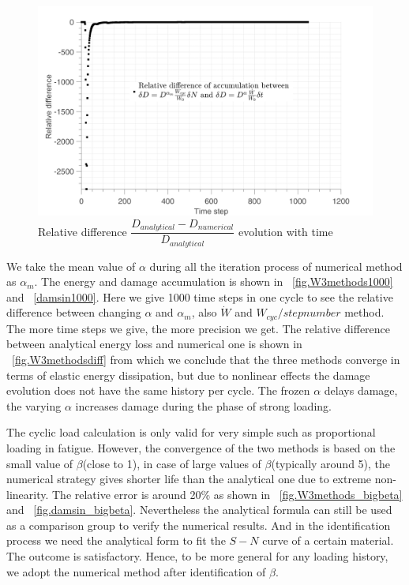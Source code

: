 \documentclass[3p,times,number,review]{elsarticle}
\newcommand{\figref}[1]{\figurename~\ref{#1}}
\begin{document}
\begin{figure}[!h]
\centering
\includegraphics[width=\textwidth]{figures//D_3methods_diff_100steps.png} 
\caption{Relative difference $\dfrac{D_{analytical}-D_{numerical}}{D_{analytical}}$ evolution with time}
\label{Damagediff}
\end{figure}
We take the mean value of $\alpha$ during all the iteration process of numerical method as $\alpha_{m}$. The energy and damage accumulation is shown in \figref{fig.W3methods1000} and \figref{damsin1000}. Here we give 1000 time steps in one cycle to see the relative difference between changing $\alpha$ and $\alpha_{m}$, also $\dot{W}$ and $W_{cyc}/stepnumber$  method. The more time steps we give, the more precision we get. The relative difference between analytical energy loss and numerical one is shown in \figref{fig.W3methodsdiff} from which we conclude that the three methods converge in terms of elastic energy dissipation, but due to nonlinear effects the damage evolution does not have the same history per cycle. The frozen $\alpha$ delays damage, the varying $\alpha$ increases damage during the phase of strong loading.

The cyclic load calculation is only valid for very simple such as proportional loading in fatigue. However, the convergence of the two methods is based on the small value of $\beta$(close to 1), in case of large values of $\beta$(typically around 5), the numerical strategy gives shorter life than the analytical one due to extreme non-linearity. The relative error is around 20\% as shown in \figref{fig.W3methods_bigbeta} and \figref{fig.damsin_bigbeta}. Nevertheless the analytical formula can still be used as a comparison group to verify the numerical results. And in the identification process we need the analytical form to fit the $S-N$ curve of a certain material. The outcome is satisfactory. Hence, to be more general for any loading history, we adopt the numerical method after identification of $\beta$. 
\end{document}
